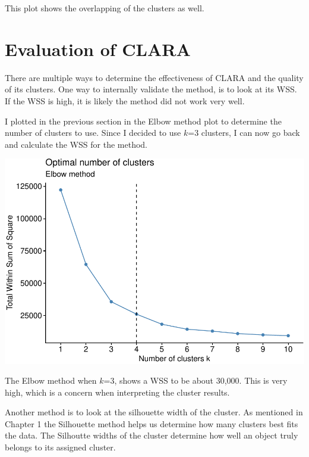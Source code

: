 \documentclass[12pt,twoside]{amherstthesis}
\begin{document}
  This plot shows the overlapping of the clusters as well.
  
  \section{Evaluation of CLARA}\label{evaluation-of-clara}
  
  There are multiple ways to determine the effectiveness of CLARA and the
  quality of its clusters. One way to internally validate the method, is
  to look at its WSS. If the WSS is high, it is likely the method did not
  work very well.
  
  I plotted in the previous section in the Elbow method plot to determine
  the number of clusters to use. Since I decided to use \(k\)=3 clusters,
  I can now go back and calculate the WSS for the method.
  
  \begin{Shaded}
  \begin{Highlighting}[]
  \end{Highlighting}
  \end{Shaded}
  
  \begin{center}\includegraphics{Comps_Proj_files/figure-latex/unnamed-chunk-11-1} \end{center}
  
  The Elbow method when \(k\)=3, shows a WSS to be about 30,000. This is
  very high, which is a concern when interpreting the cluster results.
  
  Another method is to look at the silhouette width of the cluster. As
  mentioned in Chapter 1 the Silhouette method helps us determine how many
  clusters best fits the data. The Silhoutte widths of the cluster
  determine how well an object truly belongs to its assigned cluster.
  
\end{document}

